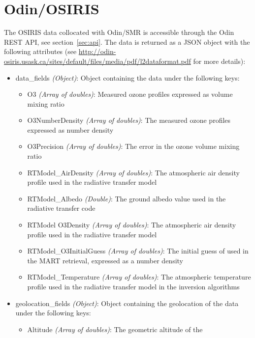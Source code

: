 \section{Odin/OSIRIS}
The OSIRIS data collocated with Odin/SMR is accessible through the Odin REST
API, see section~\ref{sec:api}. The data is returned as a JSON object with the
following attributes (see \url{http://odin-osiris.usask.ca/sites/default/files/media/pdf/l2dataformat.pdf}
for more details):
\begin{itemize}
    \item data\_fields \emph{(Object)}: Object containing the data under the
        following keys:
        \begin{itemize}
            \item O3                     \emph{(Array of doubles)}: Measured ozone profiles 
                expressed as volume mixing ratio
            \item O3NumberDensity        \emph{(Array of doubles)}: The measured ozone profiles 
                expressed as number density
            \item O3Precision            \emph{(Array of doubles)}: The error in the ozone volume 
                mixing ratio
            \item RTModel\_AirDensity     \emph{(Array of doubles)}: The atmospheric air density 
                profile used in the radiative transfer model
            \item RTModel\_Albedo         \emph{(Double)}: The ground albedo value used in the 
                radiative transfer code
            \item RTModel O3Density      \emph{(Array of doubles)}: The atmospheric air density 
                profile used in the radiative transfer model
            \item RTModel\_O3InitialGuess \emph{(Array of doubles)}: The initial guess of  
                used in the MART retrieval, expressed as a number density
            \item RTModel\_Temperature    \emph{(Array of doubles)}: The atmospheric temperature 
                profile used in the radiative transfer model in the inversion algorithms
        \end{itemize}
    \item geolocation\_fields \emph{(Object)}: Object containing the
        geolocation of the data under the following keys:
        \begin{itemize}
            \item Altitude              \emph{(Array of doubles)}: The geometric altitude of the 

\end{itemize}
\end{itemize}
